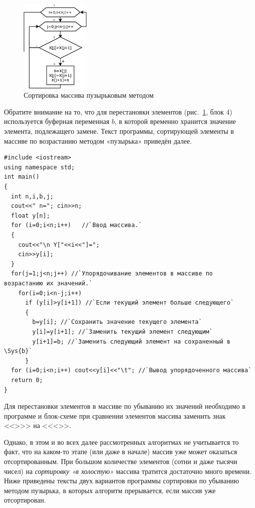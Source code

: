 \begin{figure}[htb]
\begin{center}
\includegraphics[width=0.3\textwidth]{img/ris_5_12}
\caption{Сортировка массива пузырьковым методом}
\label{ch05:refDrawing11}
\end{center}
\end{figure}

Обратите внимание на то, что для перестановки элементов (рис.~\ref{ch05:refDrawing11}, блок 4) используется буферная
переменная $b$, в которой временно хранится значение элемента, подлежащего замене. Текст программы, сортирующей элементы
в массиве по возрастанию методом «пузырька» приведён далее.
\begin{lstlisting}
#include <iostream>
using namespace std;
int main()
{
  int n,i,b,j;
  cout<<" n="; cin>>n;
  float y[n];
  for (i=0;i<n;i++)   //`Ввод массива.`
  {
    cout<<"\n Y["<<i<<"]=";
    cin>>y[i];
  }
  for(j=1;j<n;j++) //`Упорядочивание элементов в массиве по возрастанию их значений.`
    for(i=0;i<n-j;i++)
      if (y[i]>y[i+1]) //`Если текущий элемент больше следующего`
      {
        b=y[i]; //`Сохранить значение текущего элемента`
        y[i]=y[i+1]; //`Заменить текущий элемент следующим`
        y[i+1]=b; //`Заменить следующий элемент на сохраненный в \Sys{b}`
      }
  for (i=0;i<n;i++) cout<<y[i]<<"\t"; //`Вывод упорядоченного массива`
  return 0;
}
\end{lstlisting}

Для перестановки элементов в массиве по убыванию их значений необходимо в программе и блок-схеме при сравнении элементов
массива заменить знак <<{>}>> на <<{<}>>.

Однако, в этом и во всех далее рассмотренных алгоритмах не учитывается то факт, что на каком-то этапе (или даже в начале)
массив уже может оказаться отсортированным. При большом количестве элементов (сотни и даже тысячи чисел) на
\emph{сортировку «в холостую»} массива тратится достаточно много времени. Ниже приведены тексты двух
вариантов программы сортировки по убыванию методом пузырька, в которых алгоритм прерывается, если массив уже
отсортирован.

